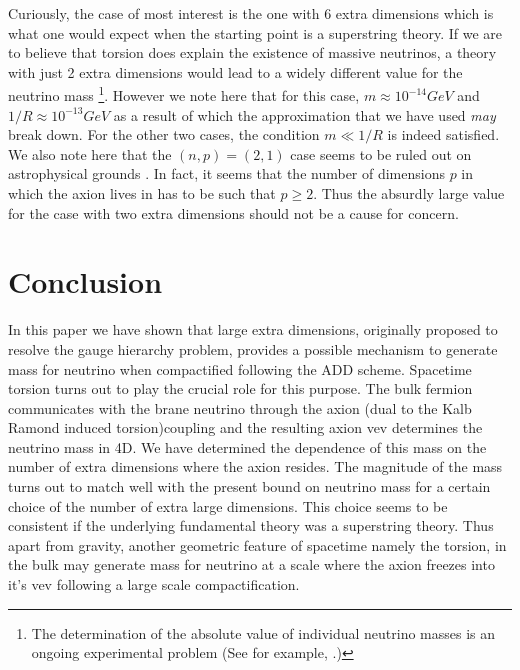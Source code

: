 \documentclass[a4paper,12pt]{article}
\begin{document}
Curiously, the case of most interest is the one with 6 extra
dimensions which is what one would expect when the starting point
is a superstring theory. If we are to believe that torsion does
explain the existence of massive neutrinos, a theory with just 2
extra dimensions would lead to a widely different value for the
neutrino mass {\footnote{The determination of the absolute value
of individual neutrino masses is an ongoing experimental problem
(See for example, \cite{Pas}.)}}. However we note here that for
this case, $m\approx 10^{-14}GeV$ and $1/R\approx 10^{-13}GeV$ as
a result of which the approximation that we have used {\it may}
break down. For the other two cases, the condition $m\ll 1/R$ is
indeed satisfied. We also note here that the $(n,p)=(2,1)$ case
seems to be ruled out on astrophysical grounds \cite{Chang}. In
fact, it seems that the number of dimensions $p$ in which the
axion lives in has to be such that $p\geq 2$. Thus the absurdly
large value for the case with two extra dimensions should not be
a cause for concern.
\section{Conclusion}
In this paper we have shown that large extra dimensions,
originally proposed to resolve the gauge hierarchy problem,
provides a possible mechanism to generate mass for neutrino when
compactified  following the ADD scheme. Spacetime torsion turns
out to play the crucial role for this purpose. The bulk fermion
communicates with the brane neutrino through the axion (dual to
the Kalb Ramond induced torsion)coupling and the resulting axion
vev determines the neutrino mass in 4D. We have determined the
dependence of this mass on the number of extra dimensions where
the axion resides. The magnitude of the mass turns out to match
well with the present bound on neutrino mass for a certain choice
of the number of extra large dimensions. This choice seems to be
consistent if the underlying fundamental theory was a superstring
theory. Thus apart from gravity, another geometric feature of
spacetime namely the torsion, in the bulk may generate mass for
neutrino at a scale where the axion freezes into it's vev
following a large scale compactification.
\end{document}
